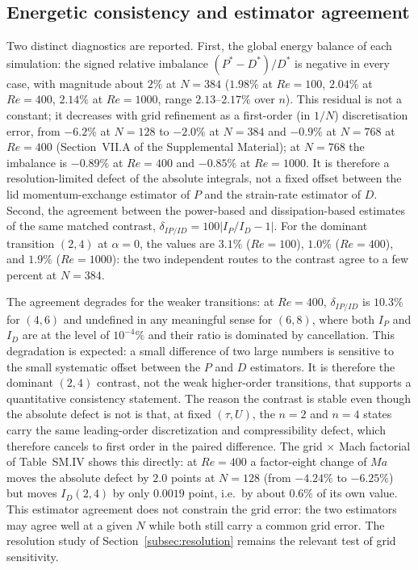 \subsection{Energetic consistency and estimator agreement}
\label{subsec:consistency}

Two distinct diagnostics are reported. First, the global energy balance of each simulation: the signed relative imbalance $(P^*-D^*)/D^*$ is negative in every case, with magnitude about $2\%$ at $N=384$ ($1.98\%$ at $Re=100$, $2.04\%$ at $Re=400$, $2.14\%$ at $Re=1000$, range $2.13$--$2.17\%$ over $n$). This residual is not a constant; it decreases with grid refinement as a first-order (in $1/N$) discretisation error, from $-6.2\%$ at $N=128$ to $-2.0\%$ at $N=384$ and $-0.9\%$ at $N=768$ at $Re=400$ (Section~VII.A of the Supplemental Material); at $N=768$ the imbalance is $-0.89\%$ at $Re=400$ and $-0.85\%$ at $Re=1000$. It is therefore a resolution-limited defect of the absolute integrals, not a fixed offset between the lid momentum-exchange estimator of $P$ and the strain-rate estimator of $D$. Second, the agreement between the power-based and dissipation-based estimates of the same matched contrast, $\delta_{IP/ID}=100|I_P/I_D-1|$. For the dominant transition $(2,4)$ at $\alpha=0$, the values are $3.1\%$ ($Re=100$), $1.0\%$ ($Re=400$), and $1.9\%$ ($Re=1000$): the two independent routes to the contrast agree to a few percent at $N=384$.

The agreement degrades for the weaker transitions: at $Re=400$, $\delta_{IP/ID}$ is $10.3\%$ for $(4,6)$ and undefined in any meaningful sense for $(6,8)$, where both $I_P$ and $I_D$ are at the level of $10^{-4}\%$ and their ratio is dominated by cancellation. This degradation is expected: a small difference of two large numbers is sensitive to the small systematic offset between the $P$ and $D$ estimators. It is therefore the dominant $(2,4)$ contrast, not the weak higher-order transitions, that supports a quantitative consistency statement. The reason the contrast is stable even though the absolute defect is not is that, at fixed $(\tau,U)$, the $n = 2$ and $n = 4$ states carry the same leading-order discretization and compressibility defect, which therefore cancels to first order in the paired difference. The grid $\times$ Mach factorial of Table~SM.IV shows this directly: at $Re = 400$ a factor-eight change of $Ma$ moves the absolute defect by $2.0$ points at $N = 128$ (from $-4.24\%$ to $-6.25\%$) but moves $I_D(2,4)$ by only $0.0019$ point, i.e.\ by about $0.6\%$ of its own value. This estimator agreement does not constrain the grid error: the two estimators may agree well at a given $N$ while both still carry a common grid error. The resolution study of Section~\ref{subsec:resolution} remains the relevant test of grid sensitivity.

